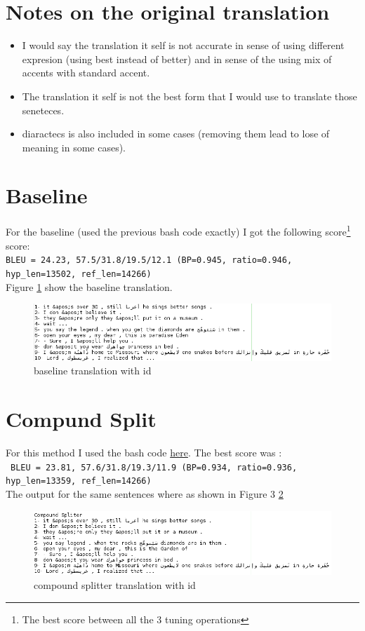 \documentclass{article}
\begin{document}
\section{Notes on the original translation}
\begin{itemize}
\item I would say the translation it self is not accurate in sense of using different expresion (using best instead of better) and in sense of the using mix of accents with standard accent.
\item The translation it self is not the best form that I would use to translate those seneteces.
\item diaractecs is also included in some cases (removing them lead to lose of meaning in some cases).
\end{itemize}
\section{Baseline}
For the baseline (used the previous bash code exactly) I got the following score\footnote{The best score between all the 3 tuning operations} score:\\ \texttt{BLEU = 24.23, 57.5/31.8/19.5/12.1 (BP=0.945, ratio=0.946, hyp\_len=13502, ref\_len=14266)}\\
Figure \ref{fig:2} show the baseline translation.
\begin{figure}[H]
\includegraphics[scale=0.5]{baselinetest.png}
\caption{baseline translation with id\label{fig:2}}
\end{figure}
\section{Compund Split}
For this method I used the bash code \href{https://github.com/aqeel13932/MT/blob/master/03PreProcessing/CompoundSplitter.sh}{here}. The best score was :\\ \
\texttt{BLEU = 23.81, 57.6/31.8/19.3/11.9 (BP=0.934, ratio=0.936, hyp\_len=13359, ref\_len=14266)}\\ The output for the same sentences where as shown in Figure 3 \ref{fig:3}
\begin{figure}[H]
\includegraphics[scale=0.5]{compoundsplitter.png}
\caption{compound splitter translation with id\label{fig:3}}
\end{figure}
\end{document}
